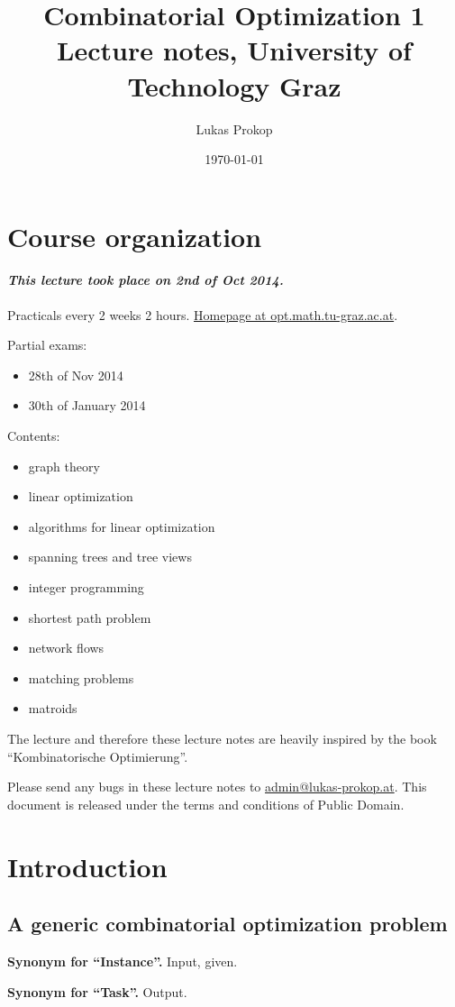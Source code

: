 \documentclass{article}
\title{
  Combinatorial Optimization 1 \\
  \large{Lecture notes, University of Technology Graz}
}
\date{\today}
\author{Lukas Prokop}
\newcommand{\dateref}[1]{\paragraph{\textit{This lecture took place on #1.}}}
\newcommand{\synonym}[2]{\textbf{Synonym for ``#1''.} #2.\par}
\begin{document}
\maketitle
\tableofcontents

\section{Course organization}
%
\dateref{2nd of Oct 2014}

Practicals every 2 weeks 2 hours.
\href{http://opt.math.tu-graz.ac.at/~cela/Vorlesungen/KombOpt1/main.htm}{Homepage at opt.math.tu-graz.ac.at}.

Partial exams:
\begin{itemize}
  \item 28th of Nov 2014
  \item 30th of January 2014
\end{itemize}

Contents:
\begin{itemize}
  \item graph theory
  \item linear optimization
  \item algorithms for linear optimization
  \item spanning trees and tree views
  \item integer programming
  \item shortest path problem
  \item network flows
  \item matching problems
  \item matroids
\end{itemize}

The lecture and therefore these lecture notes are heavily inspired by the book ``Kombinatorische Optimierung''.

Please send any bugs in these lecture notes to \href{mailto:admin@lukas-prokop.at}{admin@lukas-prokop.at}.
This document is released under the terms and conditions of Public Domain.

\newpage
\section{Introduction}

\subsection{A generic combinatorial optimization problem}
%
\synonym{Instance}{Input, given}
\synonym{Task}{Output}
\end{document}
